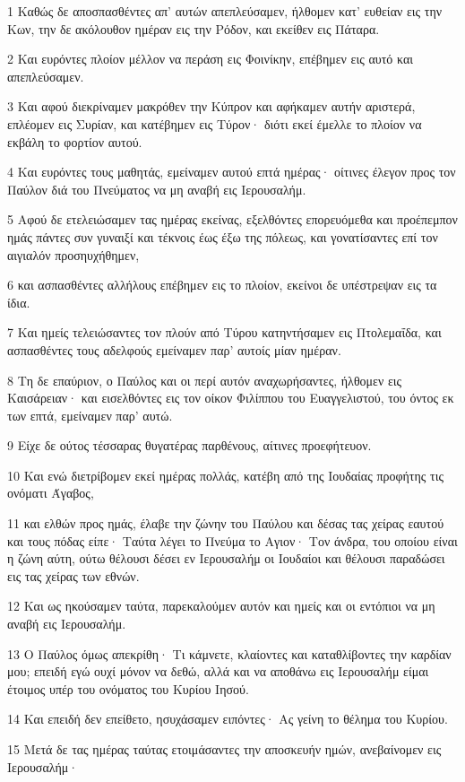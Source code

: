 \par 1 Καθώς δε αποσπασθέντες απ' αυτών απεπλεύσαμεν, ήλθομεν κατ' ευθείαν εις την Κων, την δε ακόλουθον ημέραν εις την Ρόδον, και εκείθεν εις Πάταρα.
\par 2 Και ευρόντες πλοίον μέλλον να περάση εις Φοινίκην, επέβημεν εις αυτό και απεπλεύσαμεν.
\par 3 Και αφού διεκρίναμεν μακρόθεν την Κύπρον και αφήκαμεν αυτήν αριστερά, επλέομεν εις Συρίαν, και κατέβημεν εις Τύρον· διότι εκεί έμελλε το πλοίον να εκβάλη το φορτίον αυτού.
\par 4 Και ευρόντες τους μαθητάς, εμείναμεν αυτού επτά ημέρας· οίτινες έλεγον προς τον Παύλον διά του Πνεύματος να μη αναβή εις Ιερουσαλήμ.
\par 5 Αφού δε ετελειώσαμεν τας ημέρας εκείνας, εξελθόντες επορευόμεθα και προέπεμπον ημάς πάντες συν γυναιξί και τέκνοις έως έξω της πόλεως, και γονατίσαντες επί τον αιγιαλόν προσηυχήθημεν,
\par 6 και ασπασθέντες αλλήλους επέβημεν εις το πλοίον, εκείνοι δε υπέστρεψαν εις τα ίδια.
\par 7 Και ημείς τελειώσαντες τον πλούν από Τύρου κατηντήσαμεν εις Πτολεμαΐδα, και ασπασθέντες τους αδελφούς εμείναμεν παρ' αυτοίς μίαν ημέραν.
\par 8 Τη δε επαύριον, ο Παύλος και οι περί αυτόν αναχωρήσαντες, ήλθομεν εις Καισάρειαν· και εισελθόντες εις τον οίκον Φιλίππου του Ευαγγελιστού, του όντος εκ των επτά, εμείναμεν παρ' αυτώ.
\par 9 Είχε δε ούτος τέσσαρας θυγατέρας παρθένους, αίτινες προεφήτευον.
\par 10 Και ενώ διετρίβομεν εκεί ημέρας πολλάς, κατέβη από της Ιουδαίας προφήτης τις ονόματι Άγαβος,
\par 11 και ελθών προς ημάς, έλαβε την ζώνην του Παύλου και δέσας τας χείρας εαυτού και τους πόδας είπε· Ταύτα λέγει το Πνεύμα το Αγιον· Τον άνδρα, του οποίου είναι η ζώνη αύτη, ούτω θέλουσι δέσει εν Ιερουσαλήμ οι Ιουδαίοι και θέλουσι παραδώσει εις τας χείρας των εθνών.
\par 12 Και ως ηκούσαμεν ταύτα, παρεκαλούμεν αυτόν και ημείς και οι εντόπιοι να μη αναβή εις Ιερουσαλήμ.
\par 13 Ο Παύλος όμως απεκρίθη· Τι κάμνετε, κλαίοντες και καταθλίβοντες την καρδίαν μου; επειδή εγώ ουχί μόνον να δεθώ, αλλά και να αποθάνω εις Ιερουσαλήμ είμαι έτοιμος υπέρ του ονόματος του Κυρίου Ιησού.
\par 14 Και επειδή δεν επείθετο, ησυχάσαμεν ειπόντες· Ας γείνη το θέλημα του Κυρίου.
\par 15 Μετά δε τας ημέρας ταύτας ετοιμάσαντες την αποσκευήν ημών, ανεβαίνομεν εις Ιερουσαλήμ·
